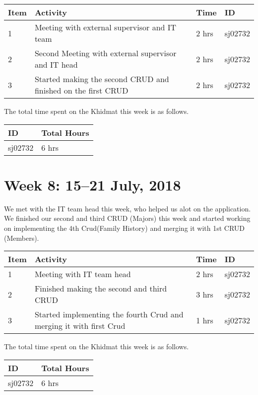 \documentclass{article}
\begin{document}
\begin{tabular}{|l|l|l|l|}
  \hline
  Item 	& Activity & Time & ID \\\hline\hline
  1	& Meeting with external supervisor and IT team & 2 hrs & sj02732 \\\hline
  2	& Second Meeting with external supervisor and IT head & 2 hrs & sj02732 \\\hline
  3	& Started making the second CRUD and finished on the first CRUD & 2 hrs & sj02732 \\\hline
\end{tabular}
\newline
The total time spent on the Khidmat this week is as follows.

\begin{tabular}{|l|l|}
  \hline
  ID & Total Hours\\\hline\hline
  sj02732 & 6 hrs\\\hline
\end{tabular}

\newpage %
\section*{Week 8: 15--21 July, 2018}

We met with the IT team head this week, who helped us alot on the application. We finished our second and third CRUD (Majors) this week and started working on implementing the 4th Crud(Family History) and merging it with 1st CRUD (Members). \newline

\begin{tabular}{|l|l|l|l|}
  \hline
  Item 	& Activity & Time & ID \\\hline\hline
  1	& Meeting with IT team head & 2 hrs & sj02732 \\\hline
  2	& Finished making the second and third CRUD  & 3 hrs & sj02732 \\\hline
  3	& Started implementing the fourth Crud and merging it with first Crud & 1 hrs & sj02732 \\\hline
\end{tabular}
\newline
The total time spent on the Khidmat this week is as follows.

\begin{tabular}{|l|l|}
  \hline
  ID & Total Hours\\\hline\hline
  sj02732 & 6 hrs\\\hline
\end{tabular}
\end{document}
